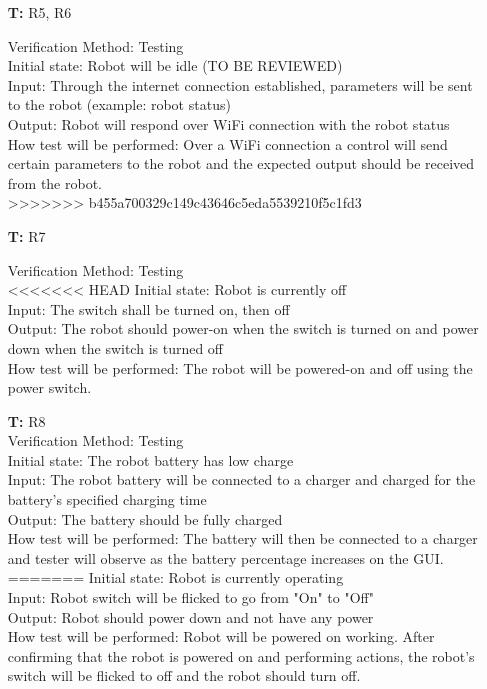 \documentclass[12pt, titlepage]{article}
\newcounter{tnum} %
\begin{document}
\begin{itemize}
\item[\textbf{T\refstepcounter{tnum}\thetnum:}]{R5, R6\\}

Verification Method: Testing\\
Initial state: Robot will be idle (TO BE REVIEWED) \\
Input: Through the internet connection established, parameters will be sent to the robot (example: robot status) \\
Output: Robot will respond over WiFi connection with the robot status  \\
How test will be performed: Over a WiFi connection a control will send certain parameters to the robot and the expected output should be received from the robot. \\
>>>>>>> b455a700329c149c43646c5eda5539210f5c1fd3

\item[\textbf{T\refstepcounter{tnum}\thetnum:}]{R7\\}

Verification Method: Testing\\
<<<<<<< HEAD
Initial state: Robot is currently off \\
Input: The switch shall be turned on, then off\\
Output: The robot should power-on when the switch is turned on and power down when the switch is turned off\\
How test will be performed: The robot will be powered-on and off using the power switch. \\

\item[\textbf{T\refstepcounter{tnum}\thetnum:}]{R8\\}
Verification Method: Testing\\
Initial state: The robot battery has low charge \\
Input: The robot battery will be connected to a charger and charged for the battery's specified charging time \\
Output: The battery should be fully charged \\
How test will be performed: The battery will then be connected to a charger and tester will observe as the battery percentage increases on the GUI.\\
=======
Initial state: Robot is currently operating \\
Input: Robot switch will be flicked to go from "On" to "Off"\\
Output: Robot should power down and not have any power \\
How test will be performed: Robot will be powered on working. After confirming that the robot is powered on and performing actions, the robot's switch will be flicked to off and the robot should turn off. \\


\end{itemize}
\end{document}
